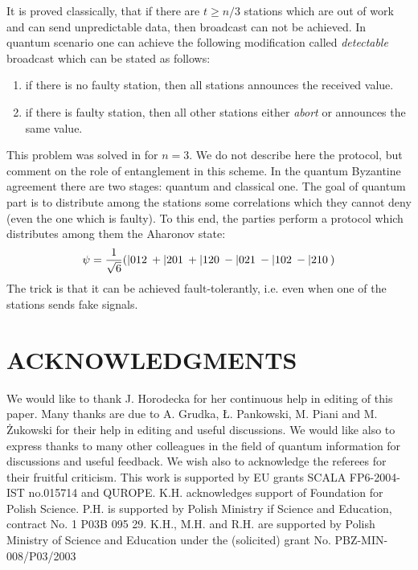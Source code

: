 \documentclass[twocolumn,aps,rmp]{revtex4}
\begin{document}
It is proved classically, that if there are $t\geq n/3$ stations
which are out of work and can send unpredictable data, then
broadcast can not be achieved. In quantum scenario one can achieve
the following modification called {\it detectable} broadcast which
can be stated as follows:

\begin{enumerate}
\item if there is no faulty station, then all stations announces the
  received value.
\item if there is faulty station, then all other stations either {\it
    abort} or announces the same value.
\end{enumerate}

This problem was solved in \cite{Gisin01-byzantine} for $n=3$.
We do not describe here the protocol, but comment on the role of
entanglement in this scheme. In the quantum Byzantine agreement there
are two stages: quantum and classical one. The goal of quantum part
is to distribute among the stations some correlations which they
cannot deny (even the one which is faulty). To this end, the
parties perform a protocol which distributes among them
the Aharonov state:
\begin{equation}
\psi={1\over \sqrt6} (|012\>+|201\>+|120\> - |021\> -|102\>-|210\>)
\end{equation}
The trick is that it can be achieved fault-tolerantly, i.e.  even when
one of the stations sends fake signals.



\section*{ACKNOWLEDGMENTS}

We would like to thank J. Horodecka for her continuous help in editing of
this paper.  Many thanks are due to A. Grudka, \L{}. Pankowski,
M. Piani and M. \.Zukowski for their help in editing and
useful discussions.  We would like also to express thanks to many other
colleagues in the field of quantum information for discussions and useful feedback.
We wish also to acknowledge the referees for their fruitful
criticism. This work is supported by EU grants SCALA FP6-2004-IST no.015714 and
QUROPE. K.H. acknowledges support of Foundation for Polish Science. P.H.
is supported by Polish Ministry if Science and Education,
contract No. 1 P03B 095 29. K.H., M.H. and R.H. are supported
by Polish Ministry of Science and Education  under the (solicited) grant
No. PBZ-MIN-008/P03/2003



\end{document}
